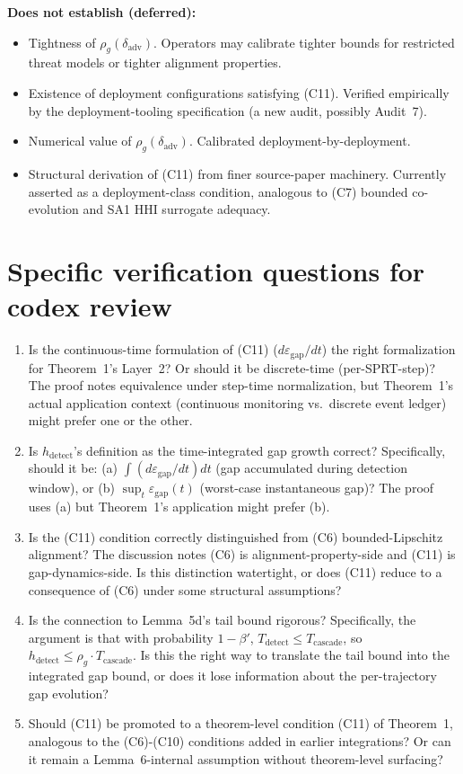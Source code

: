\documentclass{article}
\newcommand{\deltaadv}{\delta_{\mathrm{adv}}}
\newcommand{\epsgap}{\varepsilon_{\mathrm{gap}}}
\begin{document}
\textbf{Does not establish (deferred):}
\begin{itemize}
\item Tightness of $\rho_g(\deltaadv)$.  Operators may calibrate
  tighter bounds for restricted threat models or tighter alignment
  properties.
\item Existence of deployment configurations satisfying (C11).
  Verified empirically by the deployment-tooling specification
  (a new audit, possibly Audit~7).
\item Numerical value of $\rho_g(\deltaadv)$.  Calibrated
  deployment-by-deployment.
\item Structural derivation of (C11) from finer source-paper
  machinery.  Currently asserted as a deployment-class condition,
  analogous to (C7) bounded co-evolution and SA1 HHI surrogate
  adequacy.
\end{itemize}

\section{Specific verification questions for codex review}

\begin{enumerate}
\item Is the continuous-time formulation of (C11) ($d\epsgap/dt$)
  the right formalization for Theorem~1's Layer~2?  Or should it
  be discrete-time (per-SPRT-step)?  The proof notes equivalence
  under step-time normalization, but Theorem~1's actual
  application context (continuous monitoring vs.\ discrete event
  ledger) might prefer one or the other.

\item Is $h_{\mathrm{detect}}$'s definition as the time-integrated
  gap growth correct?  Specifically, should it be:
  (a) $\int (d\epsgap/dt) dt$ (gap accumulated during detection
  window), or
  (b) $\sup_t \epsgap(t)$ (worst-case instantaneous gap)?
  The proof uses (a) but Theorem~1's application might prefer (b).

\item Is the (C11) condition correctly distinguished from (C6)
  bounded-Lipschitz alignment?  The discussion notes (C6) is
  alignment-property-side and (C11) is gap-dynamics-side.  Is
  this distinction watertight, or does (C11) reduce to a
  consequence of (C6) under some structural assumptions?

\item Is the connection to Lemma~5d's tail bound rigorous?
  Specifically, the argument is that with probability $1 - \beta'$,
  $T_{\mathrm{detect}} \leq T_{\mathrm{cascade}}$, so
  $h_{\mathrm{detect}} \leq \rho_g \cdot T_{\mathrm{cascade}}$.
  Is this the right way to translate the tail bound into the
  integrated gap bound, or does it lose information about the
  per-trajectory gap evolution?

\item Should (C11) be promoted to a theorem-level condition (C11)
  of Theorem~1, analogous to the (C6)-(C10) conditions added in
  earlier integrations?  Or can it remain a Lemma~6-internal
  assumption without theorem-level surfacing?
\end{enumerate}
\end{document}

